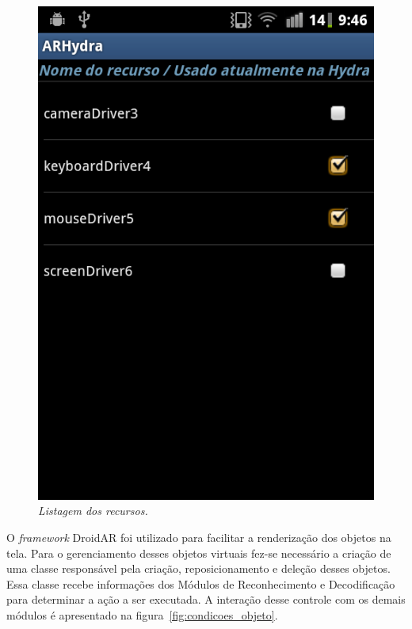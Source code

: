 	
	\begin{figure}[htb]
		\centering \includegraphics[scale=0.35]{figuras/cap4/listagem_recursos.png}
		\caption{\textit{Listagem dos recursos.}}
		\label{fig:listagem_recursos} 
	\end{figure}
	
	O \textit{framework} DroidAR \cite{droidar} foi utilizado para facilitar a renderização dos objetos 
	na tela. Para o gerenciamento desses objetos virtuais fez-se necessário a criação de uma classe 
	responsável pela criação, reposicionamento e deleção desses objetos. Essa classe recebe informações
	dos Módulos de Reconhecimento e Decodificação para determinar a ação a ser executada. A interação
	desse controle com os demais módulos é apresentado na figura~\ref{fig:condicoes_objeto}.

